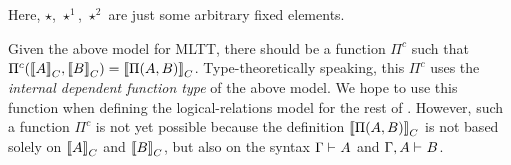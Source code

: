 \newcommand{\Glued}[1]{\ensuremath{{#1}^\bullet}}
\newcommand{\GluedPi}[2]{\ensuremath{\Pi^\bullet({#1},{#2})}}
\newcommand{\GSubstExt}[2]{\ensuremath{{#1},^\bullet{#2}}}
\newcommand{\Gpair}[2]{\ensuremath{({#1},^\bullet{#2})}}
\newcommand{\Gfst}[1]{\ensuremath{\texttt{fst}^\bullet~{#1}}}
\newcommand{\Gsnd}[1]{\ensuremath{\texttt{snd}^\bullet~{#1}}}
\newcommand{\Gsub}[2]{\ensuremath{{#1}\!\left[{#2}\right]^\bullet}}
\newcommand{\Glam}[1]{\ensuremath{\lambda^\bullet({#1})}}
\newcommand{\Gapp}[1]{\ensuremath{\texttt{app}^\bullet({#1})}}
\newcommand{\GSubstWeak}[1]{\ensuremath{(\texttt{p}^{#1})^{\bullet}}}
\newcommand{\GLSigAdd}[3]{\ensuremath{\nu^{+\bullet}({#1},{#2},{#3})}}
\newcommand{\GCaseSig}[3]{\ensuremath{\texttt{CaseTy}^\bullet({#1},{#2},{#3})}}
\newcommand{\Gmodel}[1]{\ensuremath{{({#1})}^c}}
\newcommand{\GEl}[1]{\ensuremath{\Glued{\texttt{El}}({#1})}}
\newcommand{\Gwcode}[1]{\ensuremath{\Glued{\texttt{W}}({#1})}}
\newcommand{\GSubstId}{\ensuremath{\Glued{"id"}}}
\newcommand{\Gwsigproj}[3]{\ensuremath{\Glued{{\texttt{w}\pi^{#1}_{\texttt{#2}}}}({#3})}}
\newcommand{\GRecproj}[2]{\ensuremath{\Glued{{\texttt{R}\pi^{#1}}}({#2})}}



Here, $\star$, $\star^1$, $\star^2$ are just some arbitrary fixed elements.  


Given the above model for MLTT, there should be a function ${\Pi}^c$ such
that ${\Pi}^c({{\llbracket {A} \rrbracket}_C},{{\llbracket {B} \rrbracket}_C}) = {\llbracket {\ensuremath{\Pi({A},{B})}} \rrbracket}_C$. 
Type-theoretically speaking, this ${\Pi}^c$ uses the \emph{internal dependent
function type} of
the above model. We hope to
use this function when defining the logical-relations model for the rest of \TT.
However, such a function $\Pi^c$ is not yet possible because the definition
${\llbracket {\ensuremath{\Pi({A},{B})}} \rrbracket}_C$ is not based solely on ${\llbracket {A} \rrbracket}_C$ and
${\llbracket {B} \rrbracket}_C$,
but also on the syntax $ {\Gamma} \vdash_{} {A} $ and $ {\Gamma, A} \vdash_{} {B} $. 

